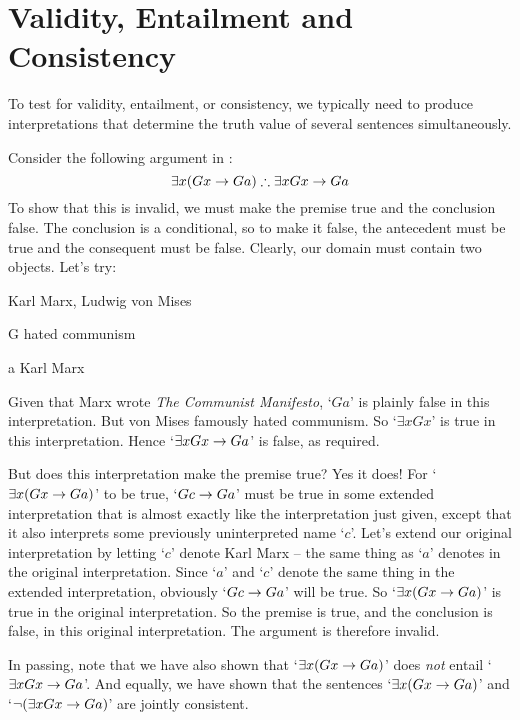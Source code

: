 \section{Validity, Entailment and Consistency}
To test for validity, entailment, or consistency, we typically need to produce interpretations that determine the truth value of several sentences simultaneously. 

Consider the following argument in \FOL:
$$\exists x(Gx \rightarrow Ga) \mathrel{\therefore} \exists x Gx \rightarrow Ga$$
To show that this is invalid, we must make the premise true and the conclusion false. The conclusion is a conditional, so to make it false, the antecedent must be true and the consequent must be false. Clearly, our domain must contain two objects. Let's try:
	\begin{ekey}
		\item[\text{domain}] Karl Marx, Ludwig von Mises
		\item[G]  hated communism
		\item[a] Karl Marx
	\end{ekey}
Given that Marx wrote \emph{The Communist Manifesto}, `$Ga$' is plainly false in this interpretation. But von Mises famously hated communism. So `$\exists x Gx$' is true in this interpretation. Hence `$\exists x Gx \rightarrow Ga$' is false, as required. 

But does this interpretation make the premise true? Yes it does! For `$\exists x (Gx \rightarrow Ga)$' to be true,  `$Gc \rightarrow Ga$' must be true in  some extended interpretation that is almost exactly like the interpretation just given, except that it also interprets some previously uninterpreted name `$c$'. Let's extend our original interpretation by letting `$c$' denote Karl Marx – the same thing as `$a$' denotes in the original interpretation. Since `$a$' and `$c$' denote the same thing in the extended interpretation, obviously `$Gc \rightarrow Ga$' will be true. So `$\exists x (Gx \rightarrow Ga)$' is true in the original interpretation. So the premise is true, and the conclusion is false, in this original interpretation. The argument is therefore invalid. 

In passing, note that we have also shown that `$\exists x(Gx \rightarrow Ga)$' does \emph{not} entail `$\exists x Gx \rightarrow Ga$'. And equally, we have shown that the sentences `$\exists x (Gx \rightarrow Ga)$' and `$\neg (\exists x Gx \rightarrow Ga)$' are jointly consistent.

